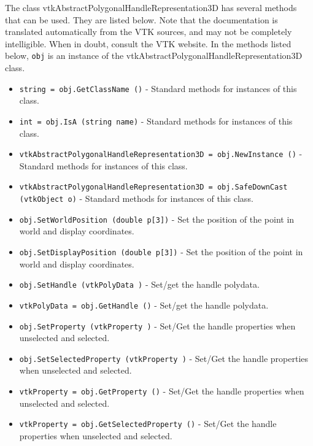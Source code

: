 The class vtkAbstractPolygonalHandleRepresentation3D has several methods that can be used.
  They are listed below.
Note that the documentation is translated automatically from the VTK sources,
and may not be completely intelligible.  When in doubt, consult the VTK website.
In the methods listed below, \verb|obj| is an instance of the vtkAbstractPolygonalHandleRepresentation3D class.
\begin{itemize}
\item  \verb|string = obj.GetClassName ()| -  Standard methods for instances of this class.

\item  \verb|int = obj.IsA (string name)| -  Standard methods for instances of this class.

\item  \verb|vtkAbstractPolygonalHandleRepresentation3D = obj.NewInstance ()| -  Standard methods for instances of this class.

\item  \verb|vtkAbstractPolygonalHandleRepresentation3D = obj.SafeDownCast (vtkObject o)| -  Standard methods for instances of this class.

\item  \verb|obj.SetWorldPosition (double p[3])| -  Set the position of the point in world and display coordinates.

\item  \verb|obj.SetDisplayPosition (double p[3])| -  Set the position of the point in world and display coordinates.

\item  \verb|obj.SetHandle (vtkPolyData )| -  Set/get the handle polydata.

\item  \verb|vtkPolyData = obj.GetHandle ()| -  Set/get the handle polydata.

\item  \verb|obj.SetProperty (vtkProperty )| -  Set/Get the handle properties when unselected and selected.

\item  \verb|obj.SetSelectedProperty (vtkProperty )| -  Set/Get the handle properties when unselected and selected.

\item  \verb|vtkProperty = obj.GetProperty ()| -  Set/Get the handle properties when unselected and selected.

\item  \verb|vtkProperty = obj.GetSelectedProperty ()| -  Set/Get the handle properties when unselected and selected.


\end{itemize}
